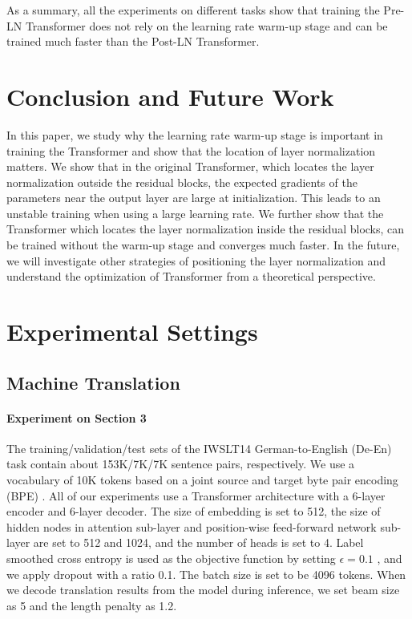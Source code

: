 \documentclass{article}
\begin{document}
As a summary, all the experiments on different tasks show that training the Pre-LN Transformer does not rely on the learning rate warm-up stage and can be trained much faster than the Post-LN Transformer.

\section{Conclusion and Future Work}
In this paper, we study why the learning rate warm-up stage is important in training the Transformer and show that the location of layer normalization matters. We show that in the original Transformer, which locates the layer normalization outside the residual blocks, the expected gradients of the parameters near the output layer are large at initialization. This leads to an unstable training when using a large learning rate. We further show that the Transformer which locates the layer normalization inside the residual blocks, can be trained without the warm-up stage and converges much faster. In the future, we will investigate other strategies of positioning the layer normalization and understand the optimization of Transformer from a theoretical perspective. 




\appendix

\section{Experimental Settings}

\subsection{Machine Translation}
\paragraph{Experiment on Section 3}
The training/validation/test sets of the IWSLT14 German-to-English (De-En) task contain about 153K/7K/7K sentence pairs, respectively. We use a vocabulary of 10K tokens based on a joint source and target byte pair encoding (BPE) \citep{sennrich2015neural}. All of our experiments use a Transformer architecture with a 6-layer encoder and 6-layer decoder. The size of embedding is set to 512, the size of hidden nodes in attention sub-layer and position-wise feed-forward network sub-layer are set to 512 and 1024, and the number of heads is set to 4. Label smoothed cross entropy is used as the objective function by setting $\epsilon = 0.1$ \citep{szegedy2016rethinking}, and we apply dropout with a ratio 0.1. The batch size is set to be 4096 tokens. When we decode translation results from the model during inference, we set beam size as 5 and the length penalty as 1.2.
\end{document}
